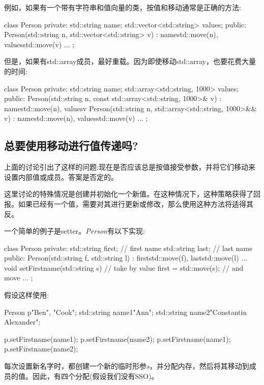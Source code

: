 例如，如果有一个带有字符串和值向量的类，按值和移动通常是正确的方法:

\begin{cppcode}
class Person {
private:
	std::string name;
	std::vector<std::string> values;
public:
	Person(std::string n, std::vector<std::string> v)
	: name{std::move(n)}, values{std::move(v)} {
	}
	...
};
\end{cppcode}

但是，如果有std::array成员，最好重载。因为即使移动std::array，也要花费大量的时间:

\begin{cppcode}
class Person {
private:
	std::string name;
	std::array<std::string, 1000> values;
public:
	Person(std::string n, const std::array<std::string, 1000>& v)
	: name{std::move(n)}, values{v} {
	}
	Person(std::string n, std::array<std::string, 1000>&& v)
	: name{std::move(n)}, values{std::move(v)} {
	}
	...
};
\end{cppcode}

\subsection{总要使用移动进行值传递吗?}

上面的讨论引出了这样的问题:现在是否应该总是按值接受参数，并将它们移动来设置内部值或成员。答案是否定的。

这里讨论的特殊情况是创建并初始化一个新值。在这种情况下，这种策略获得了回报。如果已经有一个值，需要对其进行更新或修改，那么使用这种方法将适得其反。

一个简单的例子是setter。\textit{Person}有以下实现:

\begin{cppcode}
class Person {
private:
	std::string first; // first name
	std::string last; // last name
public:
	Person(std::string f, std::string l)
	: first{std::move(f)}, last{std::move(l)} {
	}
	...
	void setFirstname(std::string s) { // take by value
		first = std::move(s); // and move
	}
	...
};
\end{cppcode}

假设这样使用:

\begin{cppcode}
Person p{"Ben", "Cook"};
std::string name1{"Ann"};
std::string name2{"Constantin Alexander"};

p.setFirstname(name1);
p.setFirstname(name2);
p.setFirstname(name1);
p.setFirstname(name2);
\end{cppcode}

每次设置新名字时，都创建一个新的临时形参\textit{s}，并分配内存，然后将其移动到成员的值。因此，有四个分配(假设我们没有SSO)。

